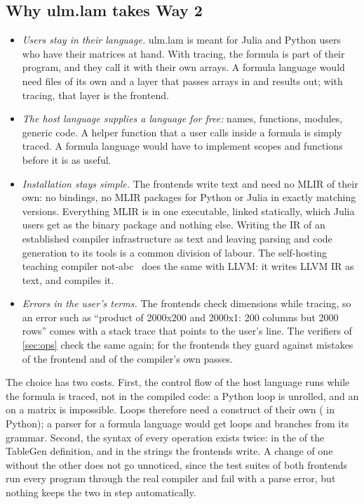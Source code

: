 \documentclass[11pt,a4paper]{article}
\let\origtexttt\texttt
\renewcommand{\texttt}[1]{\highLight[ttbg]{\origtexttt{#1}}}
\begin{document}
\subsection{Why ulm.lam takes Way 2}

\begin{itemize}
\item \emph{Users stay in their language.} ulm.lam is meant for Julia and
  Python users who have their matrices at hand. With tracing, the formula
  is part of their program, and they call it with their own arrays. A
  formula language would need files of its own and a layer that passes
  arrays in and results out; with tracing, that layer is the frontend.
\item \emph{The host language supplies a language for free:} names,
  functions, modules, generic code. A helper function that a user calls
  inside a formula is simply traced. A formula language would have to
  implement scopes and functions before it is as useful.
\item \emph{Installation stays simple.} The frontends write text and need
  no MLIR of their own: no bindings, no MLIR packages for Python or Julia
  in exactly matching versions. Everything MLIR is in one executable,
  linked statically, which Julia users get as the binary package
  \texttt{ulm\_lam\_jll} and nothing else. Writing the IR of an
  established compiler infrastructure as text and leaving parsing and
  code generation to its tools is a common division of labour. The
  self-hosting teaching compiler not-abc~\cite{notabc} does the same with
  LLVM: it writes LLVM IR as text, and \texttt{clang} compiles it.
\item \emph{Errors in the user's terms.} The frontends check dimensions
  while tracing, so an error such as ``product of 2000x200 and 2000x1: 200
  columns but 2000 rows'' comes with a stack trace that points to the
  user's line. The verifiers of \cref{sec:ops} check the same again; for
  the frontends they guard against mistakes of the frontend and of the
  compiler's own passes.
\end{itemize}

The choice has two costs. First, the control flow of the host language
runs while the formula is traced, not in the compiled code: a Python
\texttt{for} loop is unrolled, and an \texttt{if} on a matrix is
impossible. Loops therefore need a construct of their own
(\texttt{lam.loop} in Python); a parser for a formula language would get
loops and branches from its grammar. Second, the syntax of every
operation exists twice: in the \texttt{assemblyFormat} of the TableGen
definition, and in the strings the frontends write. A change of one without
the other does not go unnoticed, since the test suites of both frontends
run every program through the real compiler and fail with a parse error,
but nothing keeps the two in step automatically.
\end{document}
